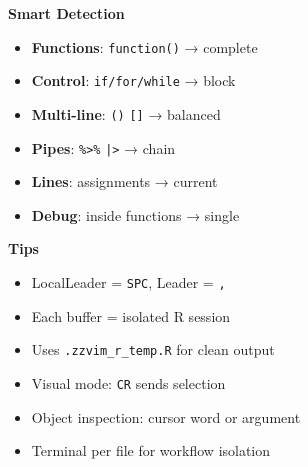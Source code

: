 \documentclass[10pt,a4paper]{article}
\begin{document}
\begin{multicols}{3}
\columnbreak

\textbf{Smart Detection}
\begin{itemize}
\item \textbf{Functions}: \texttt{function()} → complete
\item \textbf{Control}: \texttt{if/for/while} → block  
\item \textbf{Multi-line}: \texttt{()} \texttt{[]} → balanced
\item \textbf{Pipes}: \texttt{\%>\%} \texttt{|>} → chain
\item \textbf{Lines}: assignments → current
\item \textbf{Debug}: inside functions → single
\end{itemize}

\vspace{4pt}
\textbf{Tips}
\begin{itemize}
\item LocalLeader = \texttt{SPC}, Leader = \texttt{,}
\item Each buffer = isolated R session
\item Uses \texttt{.zzvim\_r\_temp.R} for clean output
\item Visual mode: \texttt{CR} sends selection
\item Object inspection: cursor word or argument
\item Terminal per file for workflow isolation
\end{itemize}

\end{multicols}
\end{document}
